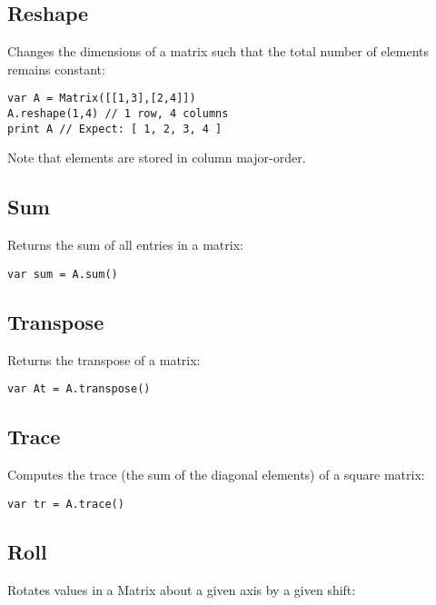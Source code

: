 \hypertarget{reshape}{%
\subsection{Reshape}\label{reshape}}

Changes the dimensions of a matrix such that the total number of
elements remains constant:

\begin{lstlisting}
var A = Matrix([[1,3],[2,4]])
A.reshape(1,4) // 1 row, 4 columns
print A // Expect: [ 1, 2, 3, 4 ]
\end{lstlisting}

Note that elements are stored in column major-order.

\hypertarget{sum}{%
\subsection{Sum}\label{sum}}

Returns the sum of all entries in a matrix:

\begin{lstlisting}
var sum = A.sum() 
\end{lstlisting}

\hypertarget{transpose}{%
\subsection{Transpose}\label{transpose}}

Returns the transpose of a matrix:

\begin{lstlisting}
var At = A.transpose()
\end{lstlisting}

\hypertarget{trace}{%
\subsection{Trace}\label{trace}}

Computes the trace (the sum of the diagonal elements) of a square
matrix:

\begin{lstlisting}
var tr = A.trace()
\end{lstlisting}

\hypertarget{roll}{%
\subsection{Roll}\label{roll}}

Rotates values in a Matrix about a given axis by a given shift:

